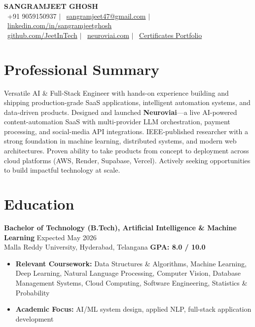 \documentclass[11pt]{article}
\begin{document}
\begin{center}
{\LARGE \textbf{SANGRAMJEET GHOSH}} \\[6pt]
{\normalsize
\faPhone\ +91 9059150937 \quad $|$ \quad
\faEnvelope\ \href{mailto:sangramjeet47@gmail.com}{sangramjeet47@gmail.com} \quad $|$ \quad
\faLinkedin\ \href{https://www.linkedin.com/in/sangramjeetghosh}{linkedin.com/in/sangramjeetghosh}
}\\[2pt]
{\normalsize
\faGithub\ \href{https://github.com/JeetInTech}{github.com/JeetInTech} \quad $|$ \quad
\faGlobe\ \href{https://neuroviai.com}{neuroviai.com} \quad $|$ \quad
\faFolder\ \href{https://drive.google.com/drive/folders/1ZQd-DeX-rXlEVDTwDJfjLjnG7iPc_fEw}{Certificates Portfolio}
}
\end{center}

\vspace{2pt}

\section*{Professional Summary}
Versatile AI \& Full-Stack Engineer with hands-on experience building and shipping production-grade SaaS applications, intelligent automation systems, and data-driven products. Designed and launched \textbf{Neuroviai}---a live AI-powered content-automation SaaS with multi-provider LLM orchestration, payment processing, and social-media API integrations. IEEE-published researcher with a strong foundation in machine learning, distributed systems, and modern web architectures. Proven ability to take products from concept to deployment across cloud platforms (AWS, Render, Supabase, Vercel). Actively seeking opportunities to build impactful technology at scale.

\section*{Education}
\textbf{Bachelor of Technology (B.Tech), Artificial Intelligence \& Machine Learning} \hfill Expected May 2026 \\
Malla Reddy University, Hyderabad, Telangana \hfill \textbf{GPA: 8.0 / 10.0}

\begin{itemize}
\item \textbf{Relevant Coursework:} Data Structures \& Algorithms, Machine Learning, Deep Learning, Natural Language Processing, Computer Vision, Database Management Systems, Cloud Computing, Software Engineering, Statistics \& Probability
\item \textbf{Academic Focus:} AI/ML system design, applied NLP, full-stack application development
\end{itemize}
\end{document}
